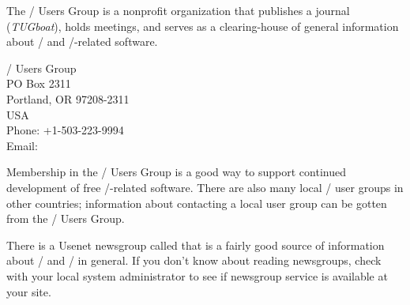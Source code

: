 \documentclass[leqno,titlepage,openany]{amsldoc}[1999/12/13]
\newcommand{\journalname}[1]{\textit{#1}}
\newenvironment{infoaddress}{%
  \par\topsep\medskipamount
  \trivlist\centering
  \item[]%
  \begin{minipage}{.7\columnwidth}%
  \raggedright
}{%
  \end{minipage}%
  \endtrivlist
}
\begin{document}
The \tex/ Users Group is a nonprofit
organization that publishes a journal
(\journalname{TUGboat}\index{TUGboat@\journalname{TUGboat}}), holds
meetings, and serves as a clearing-house of general information about
\tex/ and \tex/-related software.
\begin{infoaddress}
\tex/ Users Group\\
PO Box 2311\\
Portland, OR 97208-2311\\
USA\\[3pt]
Phone: +1-503-223-9994\\
Email: 
\end{infoaddress}
Membership in the \tex/ Users Group is a good way to support continued
development of free \tex/-related software. There are also many local
\tex/ user groups in other countries; information about contacting a
local user group can be gotten from the \tex/ Users Group.

There is a Usenet newsgroup called  that is a fairly
good source of information about \latex/ and \tex/ in general. If you
don't know about reading newsgroups, check with your local system
administrator to see if newsgroup service is available at your site.
\end{document}
